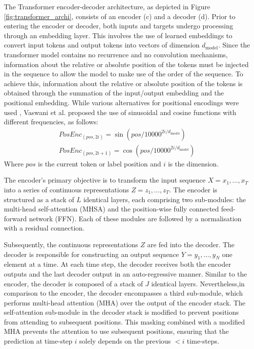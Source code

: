 The Transformer encoder-decoder architecture, as depicted in Figure \ref{fig:transformer_archi}, consists of an encoder (c) and a decoder (d). Prior to entering the encoder or decoder, both inputs and targets undergo processing through an embedding layer. This involves the use of learned embeddings to convert input tokens and output tokens into vectors of dimension $d_{\text{model}}$. 
Since the transformer model contains no recurrence and no convolution mechanisms, information about the relative or absolute position of the tokens must be injected in the sequence to allow the model to make use of the order of the sequence. To achieve this, information about the relative or absolute position of the tokens is obtained through the summation of the input/output embedding and the positional embedding. While various alternatives for positional encodings were used , Vaswani et al. \cite{vaswani2017attention} proposed the use of sinusoidal and cosine functions with different frequencies, as follows:
\begin{align}
    PosEnc_{(pos,2i)} = \sin(pos/10000^{2i/d_{\text{model}}})\\
    PosEnc_{(pos,2i+1)} = \cos(pos/10000^{2i/d_{\text{model}}})
\end{align}
Where $pos$ is the current token or label position and $i$ is the dimension.
 

The encoder's primary objective is to transform the input sequence $X = x_1, \dots, x_T$ into a series of continuous representations $Z = z_1, \dots, z_T$. The encoder is structured as a stack of $L$ identical layers, each comprising two sub-modules: the multi-head self-attention (MHSA) and the position-wise fully connected feed-forward network (FFN). Each of these modules are followed by a normalisation with a residual connection.

Subsequently, the continuous representations $Z$ are fed into the decoder. The decoder is responsible for constructing an output sequence $Y = y_1, \dots, y_N$ one element at a time. At each time step, the decoder receives both the encoder outputs and the last decoder output in an auto-regressive manner. Similar to the encoder, the decoder is composed of a stack of $J$ identical layers. Nevertheless,in comparison to the encoder, the decoder encompasses a third sub-module, which performs multi-head attention (MHA) over the output of the encoder stack. The self-attention sub-module in the decoder stack is modified to prevent positions from attending to subsequent positions. This masking combined with a modified MHA prevents the attention to use subsequent positions, ensuring that the prediction at time-step $i$ solely depends on the previous $< i$ time-steps.


